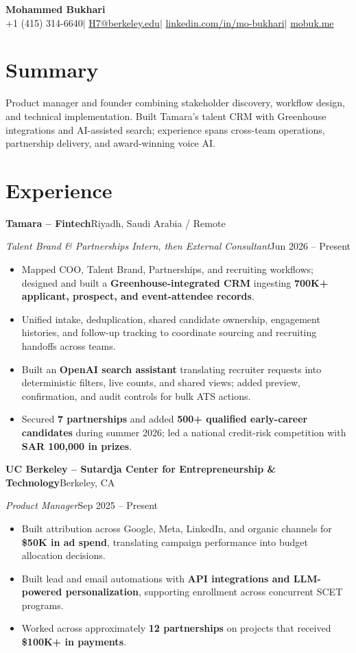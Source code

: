 \documentclass[a4paper,10pt]{article}
\newcommand{\entry}[4]{%
  \textbf{#1}\hfill #2\par
  \textit{#3}\hfill #4\par
}
\begin{document}
\begin{center}
  {\LARGE\bfseries Mohammed Bukhari}\\[3pt]
  +1 (415) 314-6640\enspace$|$\enspace
  \href{mailto:H7@berkeley.edu}{H7@berkeley.edu}\enspace$|$\enspace
  \href{https://www.linkedin.com/in/mo-bukhari/}{linkedin.com/in/mo-bukhari}\enspace$|$\enspace
  \href{https://mobuk.me}{mobuk.me}
\end{center}
\vspace{-5pt}

\section{Summary}
Product manager and founder combining stakeholder discovery, workflow
design, and technical implementation. Built Tamara's talent CRM with
Greenhouse integrations and AI-assisted search; experience spans
cross-team operations, partnership delivery, and award-winning voice AI.

\section{Experience}

\entry
{Tamara -- Fintech}
{Riyadh, Saudi Arabia / Remote}
{Talent Brand \& Partnerships Intern, then External Consultant}
{Jun 2026 -- Present}
\begin{itemize}
  \item Mapped COO, Talent Brand, Partnerships, and recruiting workflows;
  designed and built a \textbf{Greenhouse-integrated CRM} ingesting
  \textbf{700K+ applicant, prospect, and event-attendee records}.
  \item Unified intake, deduplication, shared candidate ownership,
  engagement histories, and follow-up tracking to coordinate sourcing
  and recruiting handoffs across teams.
  \item Built an \textbf{OpenAI search assistant} translating recruiter
  requests into deterministic filters, live counts, and shared views;
  added preview, confirmation, and audit controls for bulk ATS actions.
  \item Secured \textbf{7 partnerships} and added
  \textbf{500+ qualified early-career candidates} during summer 2026;
  led a national credit-risk competition with
  \textbf{SAR 100,000 in prizes}.
\end{itemize}

\entry
{UC Berkeley -- Sutardja Center for Entrepreneurship \& Technology}
{Berkeley, CA}
{Product Manager}
{Sep 2025 -- Present}
\begin{itemize}
  \item Built attribution across Google, Meta, LinkedIn, and organic
  channels for \textbf{\$50K in ad spend}, translating campaign
  performance into budget allocation decisions.
  \item Built lead and email automations with
  \textbf{API integrations and LLM-powered personalization},
  supporting enrollment across concurrent SCET programs.
  \item Worked across approximately \textbf{12 partnerships} on
  projects that received \textbf{\$100K+ in payments}.
\end{itemize}
\end{document}
